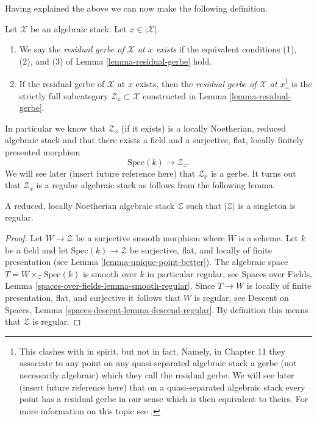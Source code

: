\noindent
Having explained the above we can now make the following definition.

\begin{definition}
\label{definition-residual-gerbe}
Let $\mathcal{X}$ be an algebraic stack. Let $x \in |\mathcal{X}|$.
\begin{enumerate}
\item We say the {\it residual gerbe of $\mathcal{X}$ at $x$ exists}
if the equivalent conditions (1), (2), and (3) of
Lemma \ref{lemma-residual-gerbe}
hold.
\item If the residual gerbe of $\mathcal{X}$ at $x$ exists, then the
{\it residual gerbe of $\mathcal{X}$ at $x$}\footnote{This clashes with
\cite{LM-B} in spirit, but not in fact. Namely, in Chapter 11 they associate
to any point on any quasi-separated algebraic stack a gerbe (not necessarily
algebraic) which they call the residual gerbe. We will see later (insert
future reference here) that on a quasi-separated algebraic stack every point
has a residual gerbe in our sense which is then equivalent to theirs. For
more information on this topic see
\cite[Appendix B]{rydh_etale_devissage}.}
is the strictly full
subcategory $\mathcal{Z}_x \subset \mathcal{X}$ constructed in
Lemma \ref{lemma-residual-gerbe}.
\end{enumerate}
\end{definition}

\noindent
In particular we know that $\mathcal{Z}_x$ (if it exists) is a
locally Noetherian, reduced algebraic stack and that there exists a
field and a surjective, flat, locally finitely presented morphism
$$
\text{Spec}(k) \longrightarrow \mathcal{Z}_x.
$$
We will see later (insert future reference here) that $\mathcal{Z}_x$
is a gerbe. It turns out that $\mathcal{Z}_x$ is a regular algebraic stack
as follows from the following lemma.

\begin{lemma}
\label{lemma-residual-gerbe-regular}
A reduced, locally Noetherian algebraic stack $\mathcal{Z}$ such that
$|\mathcal{Z}|$ is a singleton is regular.
\end{lemma}

\begin{proof}
Let $W \to \mathcal{Z}$ be a surjective smooth morphism where $W$ is a scheme.
Let $k$ be a field and let $\text{Spec}(k) \to \mathcal{Z}$ be surjective,
flat, and locally of finite presentation (see
Lemma \ref{lemma-unique-point-better}).
The algebraic space $T = W \times_\mathcal{Z} \text{Spec}(k)$ is
smooth over $k$ in particular regular, see
Spaces over Fields, Lemma \ref{spaces-over-fields-lemma-smooth-regular}.
Since $T \to W$ is locally of finite presentation, flat, and surjective it
follows that $W$ is regular, see
Descent on Spaces, Lemma \ref{spaces-descent-lemma-descend-regular}.
By definition this means that $\mathcal{Z}$ is regular.
\end{proof}

